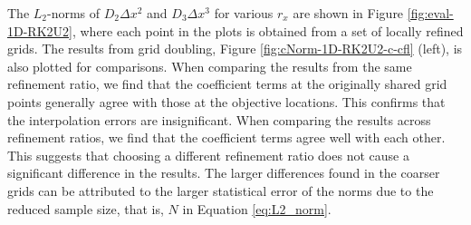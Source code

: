 The $L_2$-norms of $D_2 \Delta x^2$ and $D_3 \Delta x^3$ for various $r_x$ are shown in Figure \ref{fig:eval-1D-RK2U2}, where each point in the plots is obtained from a set of locally refined grids. The results from grid doubling, Figure \ref{fig:cNorm-1D-RK2U2-c-cfl} (left), is also plotted for comparisons. When comparing the results from the same refinement ratio, we find that the coefficient terms at the originally shared grid points generally agree with those at the objective locations. This confirms that the interpolation errors are insignificant. When comparing the results across refinement ratios, we find that the coefficient terms agree well with each other. This suggests that choosing a different refinement ratio does not cause a significant difference in the results. The larger differences found in the coarser grids can be attributed to the larger statistical error of the norms due to the reduced sample size, that is, $N$ in Equation \ref{eq:L2_norm}.


\FloatBarrier